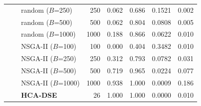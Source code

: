 \begin{tabular}{lllrrrrr}
 & & random ($B$=250) & 250 & 0.062 & 0.686 & 0.1521 & 0.002 \\
 & & random ($B$=500) & 500 & 0.062 & 0.804 & 0.0808 & 0.005 \\
 & & random ($B$=1000) & 1000 & 0.188 & 0.866 & 0.0622 & 0.010 \\
 & & NSGA-II ($B$=100) & 100 & 0.000 & 0.404 & 0.3482 & 0.010 \\
 & & NSGA-II ($B$=250) & 250 & 0.312 & 0.793 & 0.0782 & 0.031 \\
 & & NSGA-II ($B$=500) & 500 & 0.719 & 0.965 & 0.0224 & 0.077 \\
 & & NSGA-II ($B$=1000) & 1000 & 0.938 & 1.000 & 0.0009 & 0.186 \\
 & & \textbf{HCA-DSE} & 26 & 1.000 & 1.000 & 0.0000 & 0.010 \\
\midrule
\bottomrule
\end{tabular}
